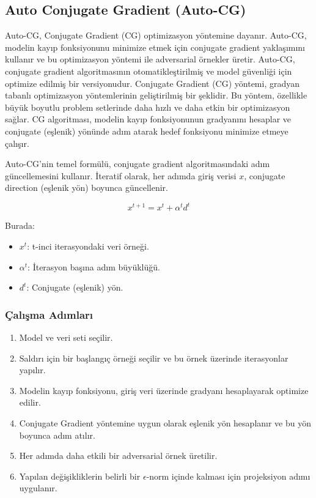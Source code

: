 \newpage

\subsection{Auto Conjugate Gradient (Auto-CG)}

Auto-CG, Conjugate Gradient (CG) optimizasyon yöntemine dayanır. Auto-CG, modelin kayıp fonksiyonunu minimize etmek için conjugate gradient yaklaşımını kullanır ve bu optimizasyon yöntemi ile adversarial örnekler üretir. Auto-CG, conjugate gradient algoritmasının otomatikleştirilmiş ve model güvenliği için optimize edilmiş bir versiyonudur. Conjugate Gradient (CG) yöntemi, gradyan tabanlı optimizasyon yöntemlerinin geliştirilmiş bir şeklidir. Bu yöntem, özellikle büyük boyutlu problem setlerinde daha hızlı ve daha etkin bir optimizasyon sağlar. CG algoritması, modelin kayıp fonksiyonunun gradyanını hesaplar ve conjugate (eşlenik) yönünde adım atarak hedef fonksiyonu minimize etmeye çalışır.

Auto-CG'nin temel formülü, conjugate gradient algoritmasındaki adım güncellemesini kullanır. İteratif olarak, her adımda giriş verisi $x$, conjugate direction (eşlenik yön) boyunca güncellenir.

\[ x^{t+1} = x^t + \alpha^t d^t \]

Burada:

\begin{itemize}
    \item $x^t$: t-inci iterasyondaki veri örneği.
    \item $\alpha^t$: İterasyon başına adım büyüklüğü.
    \item $d^t$: Conjugate (eşlenik) yön.
\end{itemize}

\subsubsection{Çalışma Adımları}

\begin{enumerate}
    \item Model ve veri seti seçilir.
    \item Saldırı için bir başlangıç örneği seçilir ve bu örnek üzerinde iterasyonlar yapılır.
    \item Modelin kayıp fonksiyonu, giriş veri üzerinde gradyanı hesaplayarak optimize edilir.
    \item Conjugate Gradient yöntemine uygun olarak eşlenik yön hesaplanır ve bu yön boyunca adım atılır.
    \item Her adımda daha etkili bir adversarial örnek üretilir.
    \item Yapılan değişikliklerin belirli bir $\epsilon$-norm içinde kalması için projeksiyon adımı uygulanır.
\end{enumerate}

